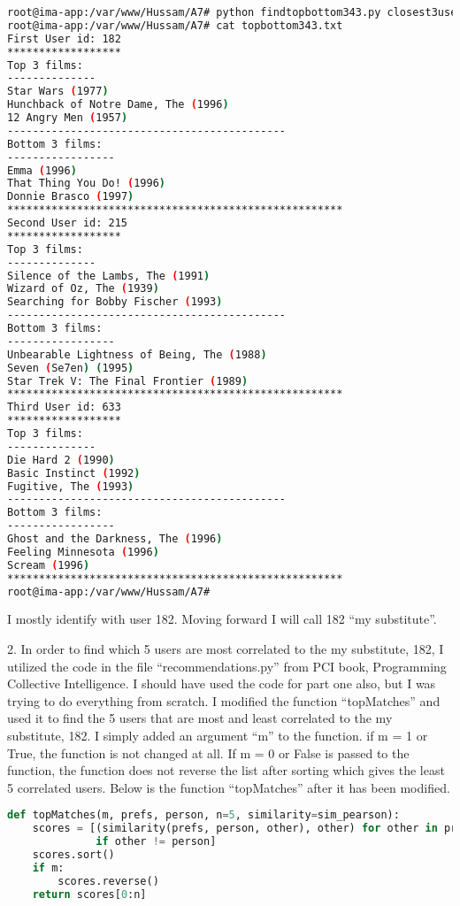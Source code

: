 \documentclass[a4paper, 11pt]{article}
\begin{document}
\begin{lstlisting}[language=bash, breakatwhitespace=〈false), label=Running findtopbottom343.py, caption=Running findtopbottom343.py]
root@ima-app:/var/www/Hussam/A7# python findtopbottom343.py closest3users.txt u.data u.item
root@ima-app:/var/www/Hussam/A7# cat topbottom343.txt
First User id: 182
******************
Top 3 films:
--------------
Star Wars (1977)
Hunchback of Notre Dame, The (1996)
12 Angry Men (1957)
--------------------------------------------
Bottom 3 films:
-----------------
Emma (1996)
That Thing You Do! (1996)
Donnie Brasco (1997)
*****************************************************
Second User id: 215
******************
Top 3 films:
--------------
Silence of the Lambs, The (1991)
Wizard of Oz, The (1939)
Searching for Bobby Fischer (1993)
--------------------------------------------
Bottom 3 films:
-----------------
Unbearable Lightness of Being, The (1988)
Seven (Se7en) (1995)
Star Trek V: The Final Frontier (1989)
*****************************************************
Third User id: 633
******************
Top 3 films:
--------------
Die Hard 2 (1990)
Basic Instinct (1992)
Fugitive, The (1993)
--------------------------------------------
Bottom 3 films:
-----------------
Ghost and the Darkness, The (1996)
Feeling Minnesota (1996)
Scream (1996)
*****************************************************
root@ima-app:/var/www/Hussam/A7#

\end{lstlisting}

I mostly identify with user 182. Moving forward I will call 182 ``my substitute''.


2. In order to find which 5 users are most correlated to the my substitute, 182, I utilized the code in the file ``recommendations.py'' from PCI book, Programming Collective Intelligence. I should have used the code for part one also, but I was trying to do everything from scratch. I modified the function ``topMatches'' and used it to find the 5 users that are most and least correlated to the my substitute, 182. I simply added an argument ``m'' to the function. if m = 1 or True, the function is not changed at all. If m = 0 or False is passed to the function, the function does not reverse the list after sorting which gives the least 5 correlated users. Below is the function ``topMatches'' after it has been modified.

\begin{lstlisting}[language=python, breakatwhitespace=〈false), label=topMatches, caption=topMatches]
def topMatches(m, prefs, person, n=5, similarity=sim_pearson):
    scores = [(similarity(prefs, person, other), other) for other in prefs
              if other != person]
    scores.sort()
    if m:
        scores.reverse()
    return scores[0:n]
\end{lstlisting}
\end{document}

